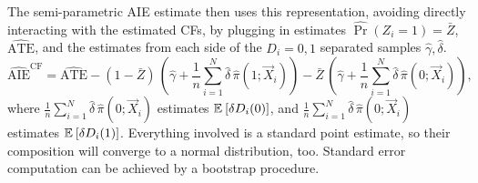 The semi-parametric AIE estimate then uses this representation, avoiding directly interacting with the estimated CFs, by plugging in estimates $\hat{\Pr}(Z_i = 1) = \bar Z$, $\hat{\text{ATE}}$, and the estimates from each side of the $D_i =0,1$ separated samples $\hat\gamma, \hat\delta$.
\[ \hat{\text{AIE}}^{\text{CF}}
    = \hat{\text{ATE}}
    - (1 - \bar Z) \, \left( \hat\gamma +
        \frac 1n \sum_{i = 1}^N \hat \delta \, \hat\pi(1; \vec X_i) \right)
    - \bar Z \, \left(\hat\gamma +
        \frac 1n \sum_{i = 1}^N \hat \delta \, \hat\pi(0; \vec X_i)  \right), \]
where $\frac 1n \sum_{i = 1}^N \hat \delta \, \hat\pi(0; \vec X_i)$ estimates $\mathbb{E}_{} \left[ \delta D_i(0) \right]$, and $\frac 1n \sum_{i = 1}^N \hat \delta \, \hat\pi(0; \vec X_i)$ estimates $\mathbb{E}_{} \left[ \delta D_i(1) \right]$.
Everything involved is a standard point estimate, so their composition will converge to a normal distribution, too.
Standard error computation can be achieved by a bootstrap procedure.


